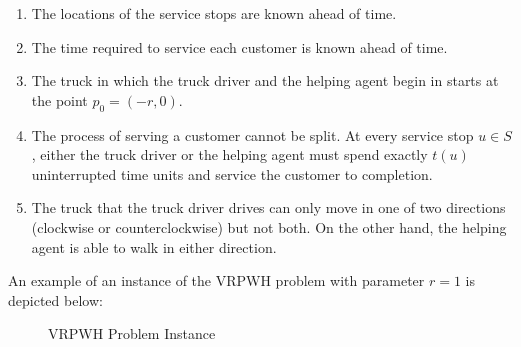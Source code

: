 \documentclass[12pt]{scrartcl}
\begin{document}
\begin{enumerate}
    \item The locations of the service stops are known ahead of time. 
    \item The time required to service each customer is known ahead of time.
    \item The truck in which the truck driver and the helping agent begin in starts at the point $p_0 = (-r, 0)$. 
    \item The process of serving a customer cannot be split. At every service stop $u \in S$, either the truck driver or the helping agent must spend exactly $t(u)$ uninterrupted time units and service the customer to completion. 
    \item The truck that the truck driver drives can only move in one of two directions (clockwise or counterclockwise) but not both. On the other hand, the helping agent is able to walk in either direction.  
\end{enumerate}

An example of an instance of the VRPWH problem with parameter $r = 1$ is depicted below:

\begin{figure}[H]
\centering
{}
\caption{VRPWH Problem Instance}
\end{figure}
\end{document}
